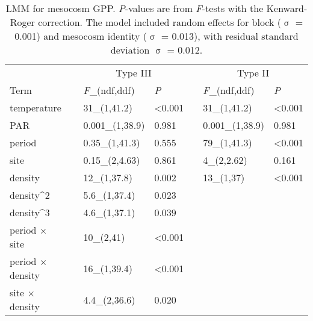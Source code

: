 \documentclass[12pt]{article}
\begin{document}

\clearpage



\clearpage







\begin{table}
\caption{\label{tab:adult}
LMM for mesocosm GPP. 
\emph{P}-values are from \emph{F}-tests with the Kenward-Roger correction.
The model included random effects for block ($\upsigma$ = 0.001)
and mesocosm identity ($\upsigma$ = 0.013), 
with residual standard deviation $\upsigma$ = 0.012.}
\setlength{\tabcolsep}{12pt}
\begin{tabular}{lllllll}
\toprule
& & \multicolumn{2}{c}{Type III} & & \multicolumn{2}{c}{Type II} \\
\cmidrule{3-4} \cmidrule{6-7}
Term & & \emph{F}_{(ndf,ddf)} & \emph{P} & & \emph{F}_{(ndf,ddf)} & \emph{P}\\
\midrule
temperature & & 31_{(1,41.2)} & <0.001 & & 31_{(1,41.2)} & <0.001\\

PAR & & 0.001_{(1,38.9)} & 0.981 & & 0.001_{(1,38.9)} & 0.981\\

period & & 0.35_{(1,41.3)} & 0.555 & & 79_{(1,41.3)} & <0.001\\

site & & 0.15_{(2,4.63)} & 0.861 & & 4_{(2,2.62)} & 0.161\\

density & & 12_{(1,37.8)} & 0.002 & & 13_{(1,37)} & <0.001\\

density^2 & & 5.6_{(1,37.4)} & 0.023 & &  & \\

density^3  & & 4.6_{(1,37.1)} & 0.039 & & & \\

period $\times$ site & & 10_{(2,41)} & <0.001 & & & \\

period $\times$ density & & 16_{(1,39.4)} & <0.001 & & & \\

site $\times$ density & & 4.4_{(2,36.6)} & 0.020 & & & \\
\bottomrule
\end{tabular}
\end{table}
\end{document}
